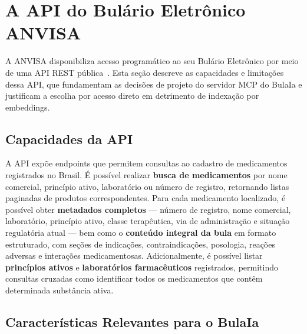 \documentclass[12pt]{article}
\begin{document}

\section{A API do Bulário Eletrônico ANVISA}
\label{sec:anvisa}

A ANVISA disponibiliza acesso programático ao seu Bulário Eletrônico por meio de uma API REST pública~\cite{anvisa2024}. Esta seção descreve as capacidades e limitações dessa API, que fundamentam as decisões de projeto do servidor MCP do BulaIa e justificam a escolha por acesso direto em detrimento de indexação por embeddings.

\subsection{Capacidades da API}

A API expõe endpoints que permitem consultas ao cadastro de medicamentos registrados no Brasil. É possível realizar \textbf{busca de medicamentos} por nome comercial, princípio ativo, laboratório ou número de registro, retornando listas paginadas de produtos correspondentes. Para cada medicamento localizado, é possível obter \textbf{metadados completos} --- número de registro, nome comercial, laboratório, princípio ativo, classe terapêutica, via de administração e situação regulatória atual --- bem como o \textbf{conteúdo integral da bula} em formato estruturado, com seções de indicações, contraindicações, posologia, reações adversas e interações medicamentosas. Adicionalmente, é possível listar \textbf{princípios ativos} e \textbf{laboratórios farmacêuticos} registrados, permitindo consultas cruzadas como identificar todos os medicamentos que contêm determinada substância ativa.

\subsection{Características Relevantes para o BulaIa}
\end{document}
